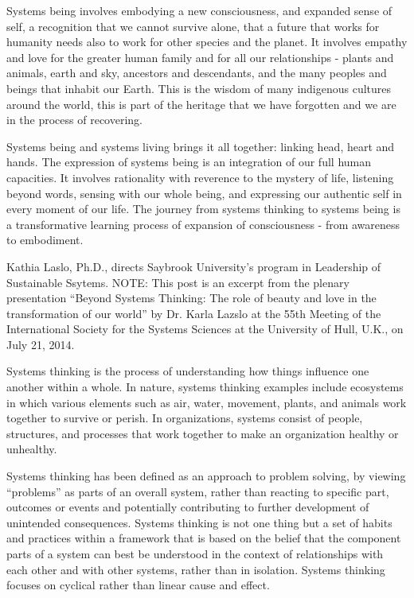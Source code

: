 Systems being involves embodying a new consciousness, and expanded sense of self, a recognition that we cannot survive alone, that a future that works for humanity needs also to work for other species and the planet. It involves empathy and love for the greater human family and for all our relationships - plants and animals, earth and sky, ancestors and descendants, and the many peoples and beings that inhabit our Earth. This is the wisdom of many indigenous cultures around the world, this is part of the heritage that we have forgotten and we are in the process of recovering.

Systems being and systems living brings it all together: linking head, heart and hands. The expression of systems being is an integration of our full human capacities. It involves rationality with reverence to the mystery of life, listening beyond words, sensing with our whole being, and expressing our authentic self in every moment of our life. The journey from systems thinking to systems being is a transformative learning process of expansion of consciousness - from awareness to embodiment.

Kathia Laslo, Ph.D., directs Saybrook University’s program in Leadership of Sustainable Ssytems.
NOTE: This post is an excerpt from the plenary presentation “Beyond Systems Thinking: The role of beauty and love in the transformation of our world” by Dr. Karla Lazslo at the 55th Meeting of the International Society for the Systems Sciences at the University of Hull, U.K., on July 21, 2014.

Systems thinking is the process of understanding how things influence one another within a whole. In nature, systems thinking examples include ecosystems in which various elements such as air, water, movement, plants, and animals work together to survive or perish. In organizations, systems consist of people, structures, and processes that work together to make an organization healthy or unhealthy.

Systems thinking has been defined as an approach to problem solving, by viewing “problems” as parts of an overall system, rather than reacting to specific part, outcomes or events and potentially contributing to further development of unintended consequences. Systems thinking is not one thing but a set of habits and practices within a framework that is based on the belief that the component parts of a system can best be understood in the context of relationships with each other and with other systems, rather than in isolation. Systems thinking focuses on cyclical rather than linear cause and effect.

